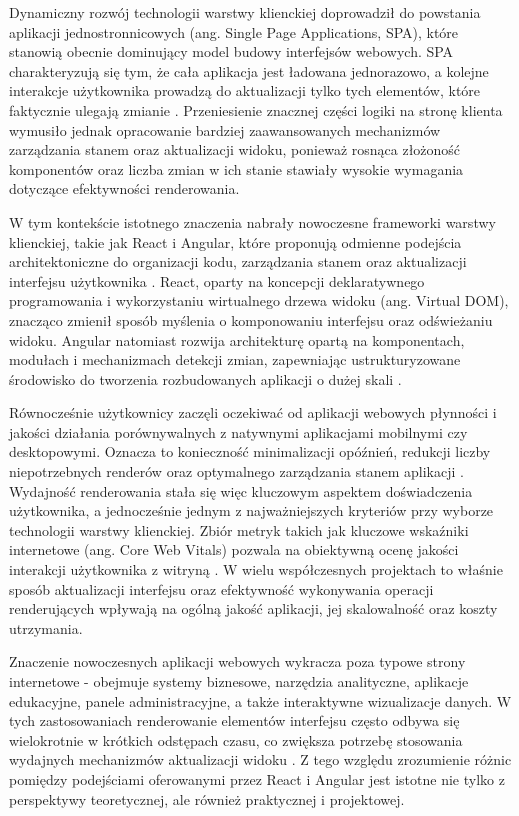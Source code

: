 \documentclass[12pt,openright,twoside]{report}
\begin{document}
Dynamiczny rozwój technologii warstwy klienckiej doprowadził do powstania aplikacji jednostronnicowych (ang. Single Page Applications, SPA), które stanowią obecnie dominujący model budowy interfejsów webowych. SPA charakteryzują się tym, że cała aplikacja jest ładowana jednorazowo, a kolejne interakcje użytkownika prowadzą do aktualizacji tylko tych elementów, które faktycznie ulegają zmianie \cite{SPA_Definition}. Przeniesienie znacznej części logiki na stronę klienta wymusiło jednak opracowanie bardziej zaawansowanych mechanizmów zarządzania stanem oraz aktualizacji widoku, ponieważ rosnąca złożoność komponentów oraz liczba zmian w ich stanie stawiały wysokie wymagania dotyczące efektywności renderowania.

W tym kontekście istotnego znaczenia nabrały nowoczesne frameworki warstwy klienckiej, takie jak React i Angular, które proponują odmienne podejścia architektoniczne do organizacji kodu, zarządzania stanem oraz aktualizacji interfejsu użytkownika \cite{React_Up_Running}. React, oparty na koncepcji deklaratywnego programowania i wykorzystaniu wirtualnego drzewa widoku (ang. Virtual DOM), znacząco zmienił sposób myślenia o komponowaniu interfejsu oraz odświeżaniu widoku. Angular natomiast rozwija architekturę opartą na komponentach, modułach i mechanizmach detekcji zmian, zapewniając ustrukturyzowane środowisko do tworzenia rozbudowanych aplikacji o dużej skali \cite{React_Up_Running, Angular_In_Action}.

Równocześnie użytkownicy zaczęli oczekiwać od aplikacji webowych płynności i jakości działania porównywalnych z natywnymi aplikacjami mobilnymi czy desktopowymi. Oznacza to konieczność minimalizacji opóźnień, redukcji liczby niepotrzebnych renderów oraz optymalnego zarządzania stanem aplikacji \cite{Nielsen_Usability}. Wydajność renderowania stała się więc kluczowym aspektem doświadczenia użytkownika, a jednocześnie jednym z najważniejszych kryteriów przy wyborze technologii warstwy klienckiej. Zbiór metryk takich jak kluczowe wskaźniki internetowe (ang. Core Web Vitals) pozwala na obiektywną ocenę jakości interakcji użytkownika z witryną \cite{Web_Vitals}. W wielu współczesnych projektach to właśnie sposób aktualizacji interfejsu oraz efektywność wykonywania operacji renderujących wpływają na ogólną jakość aplikacji, jej skalowalność oraz koszty utrzymania.

Znaczenie nowoczesnych aplikacji webowych wykracza poza typowe strony internetowe - obejmuje systemy biznesowe, narzędzia analityczne, aplikacje edukacyjne, panele administracyjne, a także interaktywne wizualizacje danych. W tych zastosowaniach renderowanie elementów interfejsu często odbywa się wielokrotnie w krótkich odstępach czasu, co zwiększa potrzebę stosowania wydajnych mechanizmów aktualizacji widoku \cite{Google_Rendering_Path}. Z tego względu zrozumienie różnic pomiędzy podejściami oferowanymi przez React i Angular jest istotne nie tylko z perspektywy teoretycznej, ale również praktycznej i projektowej.
\end{document}
